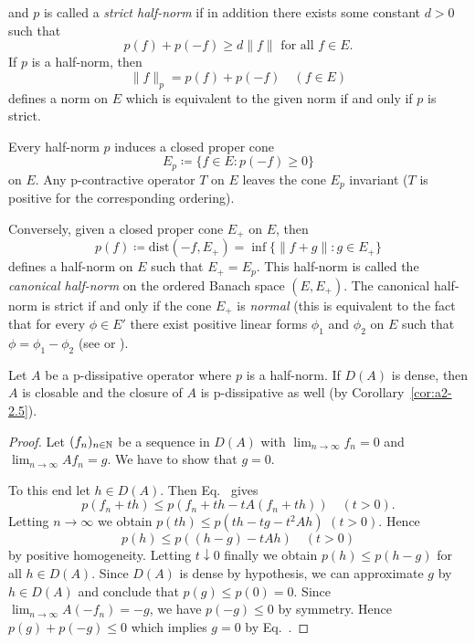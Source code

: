 and $p$ is called a \emph{strict half-norm} if in addition there exists some constant $d > 0$ such that
\begin{equation}\label{eq:a2-2.12}
p(f) + p(-f) \geq d\|f\| \text{ for all } f \in E.
\end{equation}
If\/ $p$ is a half-norm, then
\begin{equation}\label{eq:a2-2.13}
\|f\|_p = p(f) + p(-f) \quad (f \in E)
\end{equation}
defines a norm on $E$ which is equivalent to the given norm if and only if\/ $p$ is strict.

\begin{remark}\label{rem:a2-2.8}
Every half-norm $p$ induces a closed proper cone 
\[
E_{p} \coloneq \{f \in E \colon p(-f) \geq 0\}
\] 
on $E$.
Any p-contractive operator $T$ on $E$ leaves the cone $E_{p}$ invariant (\ie  $T$ is positive for the corresponding ordering).

Conversely, given a closed proper cone $E_{+}$ on $E$, then 
\[
p(f) \coloneq \text{dist}(-f,E_{+}) = \inf\{\|f + g\| \colon g \in E_{+}\}
\]
defines a half-norm on $E$ such that $E_{+} = E_{p}$.
This half-norm is called the \emph{canonical half-norm} on the ordered Banach space $(E,E_{+})$.
The canonical half-norm is strict if and only if the cone $E_{+}$ is \emph{normal} (this is equivalent to the fact that for every $\phi \in E'$ there exist positive linear forms $\phi_{1}$ and $\phi_{2}$ on $E$ such that $\phi = \phi_{1} - \phi_{2}$ (see \textcite{battyrobinson:1984} or \textcite[Chapter V]{schaefer:1966}).
\end{remark}
\begin{proposition}\label{prop:a2-2.9}
Let $A$ be a p-dissipative operator where $p$ is a half-norm.
If\/ $D(A)$ is dense, then $A$ is closable and the closure of\/ $A$ is p-dissipative as well (by Corollary~\ref{cor:a2-2.5}). 
\end{proposition}
\begin{proof}
Let $(f_{n})_{n \in \mathbb{N}}$ be a sequence in $D(A)$ with $\lim_{n \to \infty} f_{n} = 0$ and $\lim_{n \to \infty} Af_{n} = g$.
We have to show that $g = 0$.

To this end let $h \in D(A)$.
Then Eq.~   
gives 
%	
\[
p(f_{n} + th) \leq p(f_{n} + th - tA(f_{n} + th)) \quad (t > 0) .
\]
%
Letting $n \to \infty$ we obtain 
$p(th) \leq p(th - tg - t^{2}Ah)$ \quad $(t > 0)$.
Hence 
\[
p(h) \leq p((h-g) - tAh) \quad (t > 0)
\] 
by positive homogeneity.
Letting $t \downarrow 0$ finally we obtain $p(h) \leq p(h - g)$ for all $h \in D(A)$.
Since $D(A)$ is dense by hypothesis, we can approximate $g$ by $h \in D(A)$ and conclude that $p(g) \leq p(0) = 0$.
Since $\lim_{n\to\infty} A(-f_{n}) = -g$, we have $p(-g) \leq 0$ by symmetry.
Hence $p(g) + p(-g) \leq 0$ which implies $g = 0$ by Eq.~. 
\end{proof}

